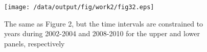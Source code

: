 \documentclass[draft,grl]{/home/gdj/文档/template/agu_template/AGUTeX}
\begin{document}
\begin{figure}
    \centering
    \noindent\texttt{[image: /data/output/fig/work2/fig32.eps]}
    \caption{The same as Figure 2, but the time intervals are constrained to years during 2002-2004 and 2008-2010 for the upper and lower panels, respectively}
    \label{figure4}
\end{figure}

\end{document}
